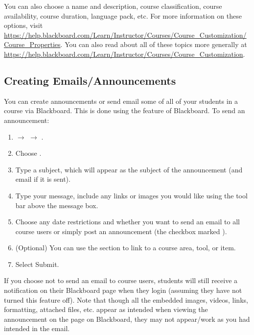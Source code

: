 You can also choose a name and description, course classification, course availability, course duration, language pack, etc. For more information on these options, visit \url{https://help.blackboard.com/Learn/Instructor/Courses/Course_Customization/Course_Properties}. You can also read about all of these topics more generally at \url{https://help.blackboard.com/Learn/Instructor/Courses/Course_Customization}. 






\subsection{Creating Emails/Announcements}

You can create announcements or send email some of all of your students in a course via Blackboard. This is done using the  feature of Blackboard. To send an announcement:

	\begin{enumerate}[1.]
	\item {} $\to$  $\to$ .
	\item Choose .
	\item Type a subject, which will appear as the subject of the announcement (and email if it is sent). 
	\item Type your message, include any links or images you would like using the tool bar above the message box. 
	\item Choose any date restrictions and whether you want to send an email to all course users or simply post an announcement (the checkbox marked  ). 
	\item (Optional) You can use the  section to link to a course area, tool, or item.
	\item Select Submit.
	\end{enumerate}

If you choose not to send an email to course users, students will still receive a notification on their Blackboard page when they login (assuming they have not turned this feature off). Note that though all the embedded images, videos, links, formatting, attached files, etc. appear as intended when viewing the announcement on the  page on Blackboard, they may not appear/work as you had intended in the email. 

